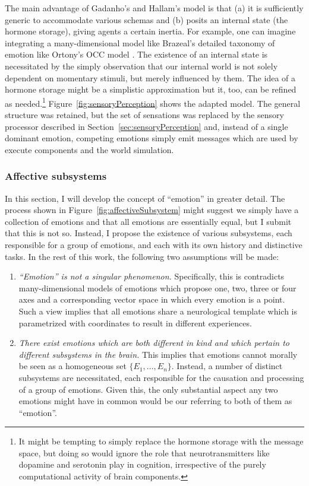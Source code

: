 \documentclass[]{scrartcl}
\theoremstyle{break}
\begin{document}
\pagebreak
The main advantage of Gadanho's and Hallam's model is that (a) it is sufficiently generic to accommodate various schemas and (b) posits an internal state (the hormone storage), giving agents a certain inertia. For example, one can imagine integrating a many-dimensional model like Brazeal's \cite{breazeal2003} detailed taxonomy of emotion like Ortony's OCC model \cite{ortony1988}. The existence of an internal state is necessitated by the simply observation that our internal world is not solely dependent on momentary stimuli, but merely influenced by them. The idea of a hormone storage might be a simplistic approximation but it, too, can be refined as needed.\footnote{It might be tempting to simply replace the hormone storage with the message space, but doing so would ignore the role that neurotransmitters like dopamine and serotonin play in cognition, irrespective of the purely computational activity of brain components.} Figure~\ref{fig:sensoryPerception} shows the adapted model. The general structure was retained, but the set of sensations was replaced by the sensory processor described in Section~\ref{sec:sensoryPerception} and, instead of a single dominant emotion, competing emotions simply emit messages which are used by execute components and the world simulation.

\subsubsection{Affective subsystems}

In this section, I will develop the concept of ``emotion'' in greater detail. The process shown in Figure~\ref{fig:affectiveSubsystem} might suggest we simply have a collection of emotions and that all emotions are essentially equal, but I submit that this is not so. Instead, I propose the existence of various subsystems, each responsible for a group of emotions, and each with its own history and distinctive tasks. In the rest of this work, the following two assumptions will be made:

\begin{enumerate}
	\item {\em ``Emotion'' is not a singular phenomenon.} Specifically, this is contradicts many-dimensional models of emotions which propose one, two, three or four axes and a corresponding vector space in which every emotion is a point. Such a view implies that all emotions share a neurological template which is parametrized with coordinates to result in different experiences.
	\item {\em There exist emotions which are both different in kind and which pertain to different subsystems in the brain.} This implies that emotions cannot morally be seen as a homogeneous set $\{E_1,\dots,E_n\}$. Instead, a number of distinct subsystems are necessitated, each responsible for the causation and processing of a group of emotions. Given this, the only substantial aspect any two emotions might have in common would be our referring to both of them as ``emotion''.
\end{enumerate}
\end{document}
